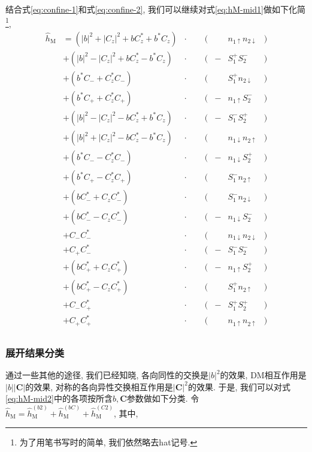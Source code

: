 \documentclass[a4paper, 12pt]{article}
\begin{document}
结合式\eqref{eq:confine-1}和式\eqref{eq:confine-2}, 我们可以继续对式\eqref{eq:hM-mid1}做如下化简\footnote{为了用笔书写时的简单, 我们依然略去hat记号.}, 
\begin{equation}
  \label{eq:hM-mid2}
  \begin{aligned}
    \widehat{h}_{\text{M}} 
    &= (|b|^2 + |C_z|^2 + bC_z^* + b^*C_z)&\cdot&\;\;&(& &n_{1\uparrow} n_{2\downarrow}&)\\
    &+ (|b|^2 - |C_z|^2 + bC_z^* - b^*C_z)&\cdot&\;\;&(&-&S_1^+ S_2^-&)\\ 
    &+ (b^*C_{-}+C^*_zC_{-})              &\cdot&\;\;&(& &S_1^+ n_{2\downarrow}&)\\
    &+ (b^*C_{+}+C^*_zC_{+})              &\cdot&\;\;&(&-&n_{1\uparrow} S_2^-&)\\
    &+ (|b|^2 - |C_z|^2 - bC_z^* + b^*C_z)&\cdot&\;\;&(&-&S_1^- S_2^+&)\\
    &+ (|b|^2 + |C_z|^2 - bC_z^* - b^*C_z)&\cdot&\;\;&(& &n_{1\downarrow} n_{2\uparrow}&)\\ 
    &+ (b^*C_{-}-C^*_zC_{-})              &\cdot&\;\;&(&-&n_{1\downarrow} S_2^+&)\\
    &+ (b^*C_{+}-C^*_zC_{+})              &\cdot&\;\;&(& &S_1^- n_{2\uparrow}&)\\
    &+ (bC^*_{-}+C_zC^*_{-})              &\cdot&\;\;&(& &S_1^- n_{2\downarrow}&)\\
    &+ (bC^*_{-}-C_zC^*_{-})              &\cdot&\;\;&(&-&n_{1\downarrow} S_2^-&)\\ 
    &+ C_{-}C^*_{-}                       &\cdot&\;\;&(& &n_{1\downarrow} n_{2\downarrow}&)\\
    &+ C_{+}C^*_{-}                       &\cdot&\;\;&(&-&S_1^- S_2^-&)\\
    &+ (bC^*_{+}+C_zC^*_{+})              &\cdot&\;\;&(&-&n_{1\uparrow}S_2^+&)\\
    &+ (bC^*_{+}-C_zC^*_{+})              &\cdot&\;\;&(& &S_1^+ n_{2\uparrow}&)\\ 
    &+ C_{-}C^*_{+}                       &\cdot&\;\;&(&-&S_1^+ S_2^+&)\\
    &+ C_{+}C^*_{+}                       &\cdot&\;\;&(& &n_{1\uparrow} n_{2\uparrow}&)\\
  \end{aligned}
\end{equation}

\subsubsection{展开结果分类}
通过一些其他的途径, 我们已经知晓, 各向同性的交换是\(|b|^2\)的效果, DM相互作用是\(|b||\bm{C}|\)的效果, 对称的各向异性交换相互作用是\(|\bm{C}|^2\)的效果. 于是, 我们可以对式\eqref{eq:hM-mid2}中的各项按所含\(b, \bm{C}\)参数做如下分类. 令\(\widehat{h}_{\text{M}} = \widehat{h}_{\text{M}}^{(b2)} + \widehat{h}_{\text{M}}^{(bC)} + \widehat{h}_{\text{M}}^{(C2)}\), 其中,
\end{document}
